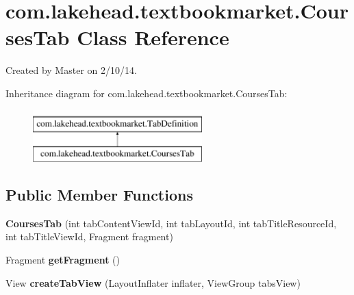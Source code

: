 \hypertarget{classcom_1_1lakehead_1_1textbookmarket_1_1_courses_tab}{\section{com.\-lakehead.\-textbookmarket.\-Courses\-Tab Class Reference}
\label{classcom_1_1lakehead_1_1textbookmarket_1_1_courses_tab}
}


Created by Master on 2/10/14.  


Inheritance diagram for com.\-lakehead.\-textbookmarket.\-Courses\-Tab\-:\begin{figure}[H]
\begin{center}
\leavevmode
\includegraphics[height=2.000000cm]{classcom_1_1lakehead_1_1textbookmarket_1_1_courses_tab}
\end{center}
\end{figure}
\subsection*{Public Member Functions}
\begin{DoxyCompactItemize}
\item 
\hypertarget{classcom_1_1lakehead_1_1textbookmarket_1_1_courses_tab_a799cc4ce607bf968277c0fe953e5b240}{{\bfseries Courses\-Tab} (int tab\-Content\-View\-Id, int tab\-Layout\-Id, int tab\-Title\-Resource\-Id, int tab\-Title\-View\-Id, Fragment fragment)}\label{classcom_1_1lakehead_1_1textbookmarket_1_1_courses_tab_a799cc4ce607bf968277c0fe953e5b240}

\item 
\hypertarget{classcom_1_1lakehead_1_1textbookmarket_1_1_courses_tab_a2ce714fe6471d2c914995e09fb2d6648}{Fragment {\bfseries get\-Fragment} ()}\label{classcom_1_1lakehead_1_1textbookmarket_1_1_courses_tab_a2ce714fe6471d2c914995e09fb2d6648}

\item 
\hypertarget{classcom_1_1lakehead_1_1textbookmarket_1_1_courses_tab_ad84c4e82ca129cb20fb1d4a534d1f289}{View {\bfseries create\-Tab\-View} (Layout\-Inflater inflater, View\-Group tabs\-View)}\label{classcom_1_1lakehead_1_1textbookmarket_1_1_courses_tab_ad84c4e82ca129cb20fb1d4a534d1f289}

\end{DoxyCompactItemize}


